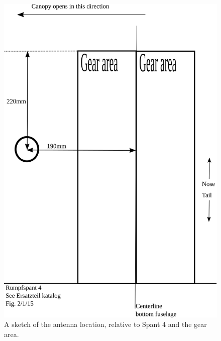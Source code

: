 \documentclass{article}
\begin{document}
\begin{figure}
\includegraphics[width=\textwidth,keepaspectratio]{antenna_location}
\caption{A sketch of the antenna location, relative to Spant 4 and the gear area.}
\label{fig:antenna_location}
\end{figure}
\end{document}
